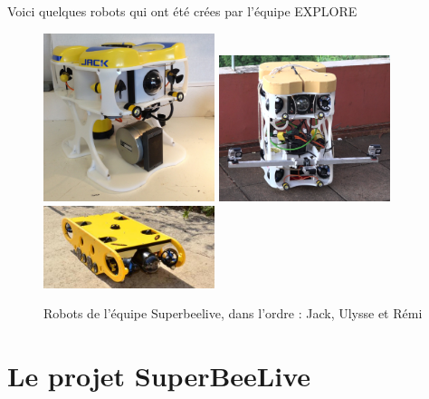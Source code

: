 \documentclass[11pt,french,a4paper]{report}
\begin{document}
Voici quelques robots qui ont été crées par l'équipe EXPLORE

\begin{figure}[!h]
    \centering 
    \includegraphics[width=5cm]{./img/robot_jack.jpg}
    \includegraphics[width=5cm]{./img/robot_ulysse.png}
    \includegraphics[width=5cm]{./img/robot.jpg}
    \caption{Robots de l'équipe Superbeelive, dans l'ordre : Jack, Ulysse et Rémi}
    \label{robot}
\end{figure}

\clearpage

\section{Le projet SuperBeeLive}
\end{document}
